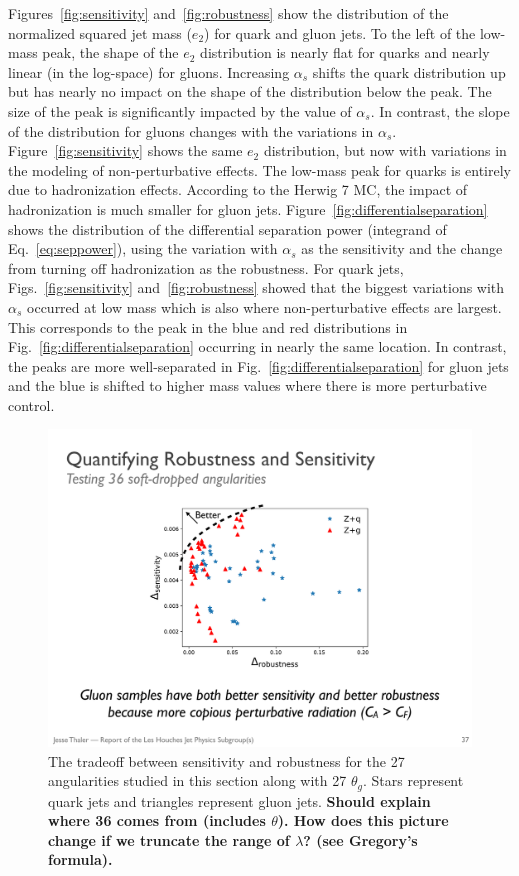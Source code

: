 Figures~\ref{fig:sensitivity} and~\ref{fig:robustness} show the distribution of the normalized squared jet mass ($e_2$) for quark and gluon jets.  To the left of the low-mass peak, the shape of the $e_2$ distribution is nearly flat for quarks and nearly linear (in the log-space) for gluons.  Increasing $\alpha_s$ shifts the quark distribution up but has nearly no impact on the shape of the distribution below the peak.  The size of the peak is significantly impacted by the value of $\alpha_s$.  In contrast, the slope of the distribution for gluons changes with the variations in $\alpha_s$.  Figure~\ref{fig:sensitivity} shows the same $e_2$ distribution, but now with variations in the modeling of non-perturbative effects.  The low-mass peak for quarks is entirely due to hadronization effects.  According to the Herwig 7 MC, the impact of hadronization is much smaller for gluon jets.  Figure~\ref{fig:differentialseparation} shows the distribution of the differential separation power (integrand of Eq.~\ref{eq:seppower}), using the variation with $\alpha_s$ as the sensitivity and the change from turning off hadronization as the robustness.  For quark jets, Figs.~\ref{fig:sensitivity} and~\ref{fig:robustness} showed that the biggest variations with $\alpha_s$ occurred at low mass which is also where non-perturbative effects are largest.  This corresponds to the peak in the blue and red distributions in Fig.~\ref{fig:differentialseparation} occurring in nearly the same location.  In contrast, the peaks are more well-separated in Fig.~\ref{fig:differentialseparation} for gluon jets and the blue is shifted to higher mass values where there is more perturbative control.  

\begin{figure}[h!]
\begin{center}
\includegraphics[width = 0.6\columnwidth]{figures/robseptradeoff.pdf}
\end{center}
\caption{The tradeoff between sensitivity and robustness for the 27
  angularities studied in this section along with 27 $\theta_g$.
  Stars represent quark jets and triangles represent gluon
  jets. \textbf{Should explain where 36 comes from (includes
    $\theta$).  How does this picture change if we truncate the range
    of $\lambda$?  (see Gregory's formula).} }
\label{fig:robseptradeoff}
\end{figure}

